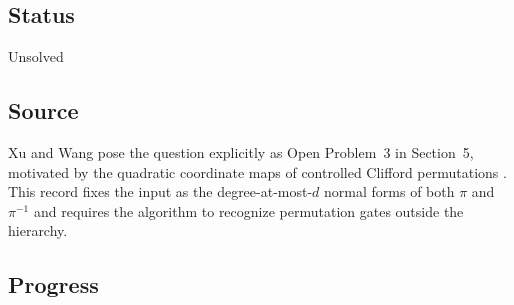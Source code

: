 \subsection*{Status}

Unsolved

\subsection*{Source}

Xu and Wang pose the question explicitly as Open Problem~3 in Section~5,
motivated by the quadratic coordinate maps of controlled Clifford
permutations .  This record fixes the input
as the degree-at-most-$d$ normal forms of both $\pi$ and $\pi^{-1}$ and
requires the algorithm to recognize permutation gates outside the
hierarchy.

\subsection*{Progress}

